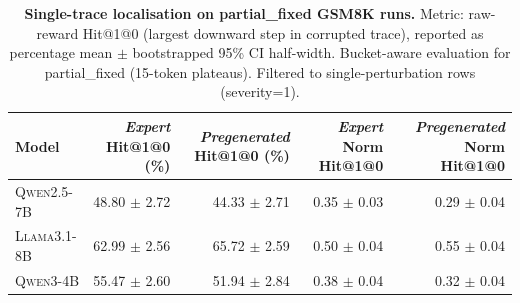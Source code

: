 \begin{table}[t]
\centering
\small
\renewcommand{\arraystretch}{1.08}
\begin{tabular}{l r r r r}
\toprule
\textbf{Model} & \textbf{\textit{Expert} Hit@1@0 (\%)} & \textbf{\textit{Pregenerated} Hit@1@0 (\%)} & \textbf{\textit{Expert} Norm Hit@1@0} & \textbf{\textit{Pregenerated} Norm Hit@1@0} \\
\midrule
\textsc{Qwen2.5-7B} & 48.80 $\pm$ 2.72 & 44.33 $\pm$ 2.71 & 0.35 $\pm$ 0.03 & 0.29 $\pm$ 0.04 \\
\textsc{Llama3.1-8B} & 62.99 $\pm$ 2.56 & 65.72 $\pm$ 2.59 & 0.50 $\pm$ 0.04 & 0.55 $\pm$ 0.04 \\
\textsc{Qwen3-4B} & 55.47 $\pm$ 2.60 & 51.94 $\pm$ 2.84 & 0.38 $\pm$ 0.04 & 0.32 $\pm$ 0.04 \\
\bottomrule
\end{tabular}
\caption{\textbf{Single-trace localisation on partial_fixed GSM8K runs.} Metric: raw-reward Hit@1@0 (largest downward step in corrupted trace), reported as percentage mean $\pm$ bootstrapped 95\% CI half-width. Bucket-aware evaluation for partial_fixed (15-token plateaus). Filtered to single-perturbation rows (severity=1).}
\label{tab:localisation_hit1at0_partial_fixed_raw}
\end{table}